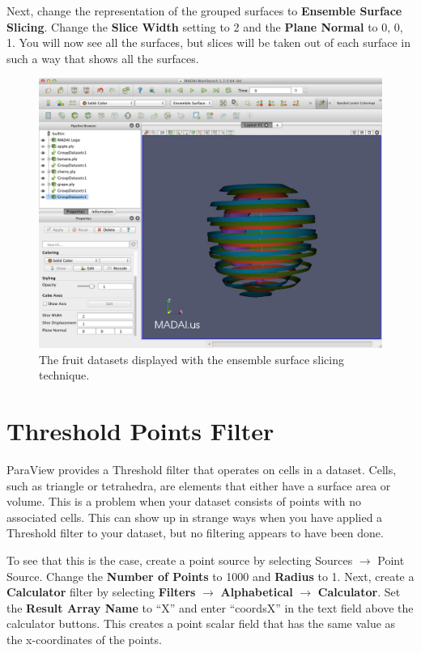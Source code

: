 \documentclass[12pt]{article}
\begin{document}
Next, change the representation of the grouped surfaces to \textbf{Ensemble Surface Slicing}. Change the \textbf{Slice Width} setting to 2 and the \textbf{Plane Normal} to 0, 0, 1. You will now see all the surfaces, but slices will be taken out of each surface in such a way that shows all the surfaces.

\begin{figure}[htbp]
   \centering
   \includegraphics[scale=.25]{images/ESSSurfaces.png} %
   \caption{The fruit datasets displayed with the ensemble surface slicing technique.}
   \label{fig:ESSSurfaces}
\end{figure}

\section{Threshold Points Filter}

ParaView provides a Threshold filter that operates on cells in a dataset. Cells, such as triangle or tetrahedra, are elements that either have a surface area or volume. This is a problem when your dataset consists of points with no associated cells. This can show up in strange ways when you have applied a Threshold filter to your dataset, but no filtering appears to have been done.

To see that this is the case, create a point source by selecting Sources $\rightarrow$ Point Source. Change the \textbf{Number of Points} to 1000 and \textbf{Radius} to 1. Next, create a \textbf{Calculator} filter by selecting \textbf{Filters} $\rightarrow$ \textbf{Alphabetical} $\rightarrow$ \textbf{Calculator}. Set the \textbf{Result Array Name} to ``X'' and enter ``coordsX'' in the text field above the calculator buttons. This creates a point scalar field that has the same value as the x-coordinates of the points.
\end{document}
